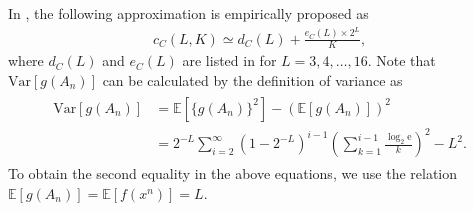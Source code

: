 In \cite{coron1999security}, the following approximation is empirically proposed as
\begin{align}
	c_C(L,K) \simeq d_C(L) + \frac{e_C(L)\times 2^L}{K},
\end{align}
where $d_C(L)$ and $e_C(L)$ are listed in \cite{coron1999security} for $L=3,4,\dots,16$.
Note that $\mathrm{Var}[g(A_n)]$ can be calculated by the definition of variance as
\begin{align}
\begin{split}
	\mathrm{Var}[g(A_n)] 
	&= \mathbb{E}[\{g(A_n)\}^2] - \left( \mathbb{E}[g(A_n)] \right)^2 \\
	&=2^{-L} \sum_{i=2}^{\infty} (1-2^{-L})^{i-1} \left( \sum_{k=1}^{i-1} \frac{\log_2 \mathrm{e}}{k} \right)^2 -L^2.
\end{split}
\end{align}
To obtain the second equality in the above equations, we use the relation $\mathbb{E}[g(A_n)]=\mathbb{E}[f(x^n)]=L$.
